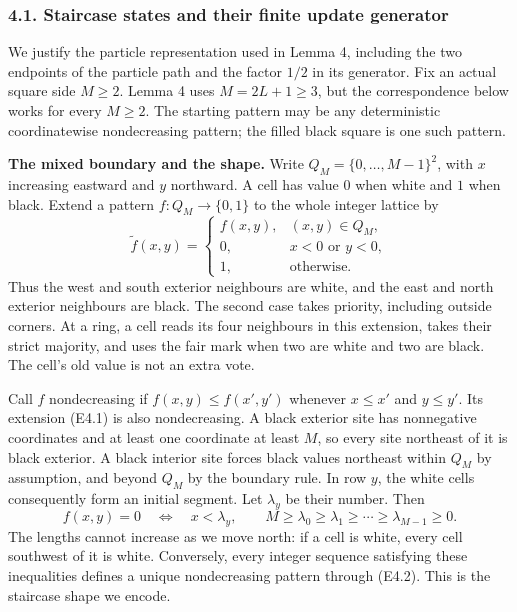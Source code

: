 \documentclass[
  11pt,
  a4paper,
]{article}
\begin{document}
\subsubsection{4.1. Staircase states and their finite update
generator}\label{staircase-states-and-their-finite-update-generator}

We justify the particle representation used in Lemma 4, including the
two endpoints of the particle path and the factor \(1/2\) in its
generator. Fix an actual square side \(M\geq2\). Lemma 4 uses
\(M=2L+1\geq3\), but the correspondence below works for every
\(M\geq2\). The starting pattern may be any deterministic coordinatewise
nondecreasing pattern; the filled black square is one such pattern.

\textbf{The mixed boundary and the shape.} Write
\(Q_M=\{0,\ldots,M-1\}^2\), with \(x\) increasing eastward and \(y\)
northward. A cell has value \(0\) when white and \(1\) when black.
Extend a pattern \(f:Q_M\to\{0,1\}\) to the whole integer lattice by \[
\widetilde f(x,y)=
\begin{cases}
f(x,y),&(x,y)\in Q_M,\\
0,&x<0\text{ or }y<0,\\
1,&\text{otherwise}.
\end{cases}
\tag{E4.1}
\] Thus the west and south exterior neighbours are white, and the east
and north exterior neighbours are black. The second case takes priority,
including outside corners. At a ring, a cell reads its four neighbours
in this extension, takes their strict majority, and uses the fair mark
when two are white and two are black. The cell's old value is not an
extra vote.

Call \(f\) nondecreasing if \(f(x,y)\leq f(x',y')\) whenever
\(x\leq x'\) and \(y\leq y'\). Its extension (E4.1) is also
nondecreasing. A black exterior site has nonnegative coordinates and at
least one coordinate at least \(M\), so every site northeast of it is
black exterior. A black interior site forces black values northeast
within \(Q_M\) by assumption, and beyond \(Q_M\) by the boundary rule.
In row \(y\), the white cells consequently form an initial segment. Let
\(\lambda_y\) be their number. Then \[
f(x,y)=0\quad\Longleftrightarrow\quad x<\lambda_y,
\qquad
M\geq\lambda_0\geq\lambda_1\geq\cdots\geq\lambda_{M-1}\geq0.
\tag{E4.2}
\] The lengths cannot increase as we move north: if a cell is white,
every cell southwest of it is white. Conversely, every integer sequence
satisfying these inequalities defines a unique nondecreasing pattern
through (E4.2). This is the staircase shape we encode.
\end{document}
